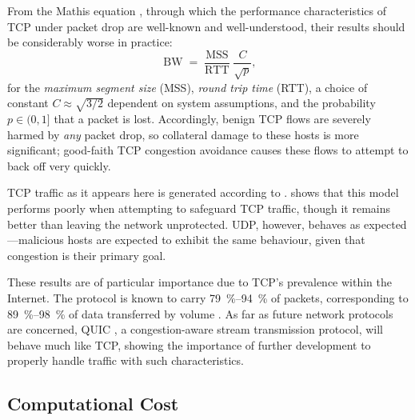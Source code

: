 \documentclass[conference, a4paper, 10pt, times]{IEEEtran}
\begin{document}
From the Mathis equation \cite{DBLP:journals/ccr/MathisSMO97}, through which the performance characteristics of TCP under packet drop are well-known and well-understood, their results should be considerably worse in practice:
\begin{equation}
\operatorname{BW} = \frac{\operatorname{MSS}}{\operatorname{RTT}} \frac{C}{\sqrt{p}},
\end{equation}
for the \emph{maximum segment size} (MSS), \emph{round trip time} (RTT), a choice of constant $C \approx{} \sqrt{3/2}$ dependent on system assumptions, and the probability $p \in (0, 1]$ that a packet is lost.
Accordingly, benign TCP flows are severely harmed by \emph{any} packet drop, so collateral damage to these hosts is more significant; good-faith TCP congestion avoidance causes these flows to attempt to back off very quickly.

TCP traffic as it appears here is generated according to .
 shows that this model performs poorly when attempting to safeguard TCP traffic, though it remains better than leaving the network unprotected.
UDP, however, behaves as expected---malicious hosts are expected to exhibit the same behaviour, given that congestion is their primary goal.

These results are of particular importance due to TCP's prevalence within the Internet.
The protocol is known to carry \SIrange{79}{94}{\percent} of packets, corresponding to \SIrange{89}{98}{\percent} of data transferred by volume \cite{DBLP:conf/saint/ZhangDJC09}.
As far as future network protocols are concerned, QUIC \cite{DBLP:conf/sigcomm/LangleyRWVKZYKS17}, a congestion-aware stream transmission protocol, will behave much like TCP, showing the importance of further development to properly handle traffic with such characteristics.

\subsection{Computational Cost}
\end{document}
